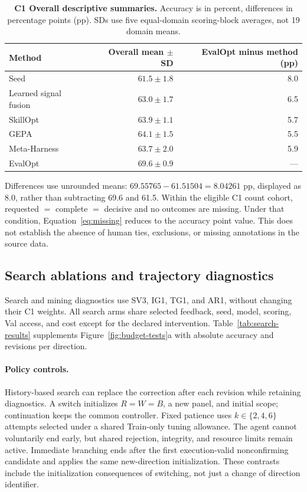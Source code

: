 \begin{table}[!htbp]
\caption{\textbf{C1 Overall descriptive summaries.}
Accuracy is in percent, differences in percentage points (pp).
SDs use five equal-domain scoring-block averages, not 19 domain means.}
\label{tab:c1-blocks}
\centering\small
\begin{tabularx}{\linewidth}{@{}Yrr@{}}
\toprule
Method & Overall mean $\pm$ SD & EvalOpt minus method (pp)\\
\midrule
Seed & $61.5\pm1.8$ & 8.0\\
Learned signal fusion & $63.0\pm1.7$ & 6.5\\
SkillOpt & $63.9\pm1.1$ & 5.7\\
GEPA & $64.1\pm1.5$ & 5.5\\
Meta-Harness & $63.7\pm2.0$ & 5.9\\
EvalOpt & $69.6\pm0.9$ & ---\\
\bottomrule
\end{tabularx}
\end{table}
Differences use unrounded means: $69.55765-61.51504=8.04261$ pp, displayed as 8.0, rather than subtracting 69.6 and 61.5.
Within the eligible C1 count cohort, requested $=$ complete $=$ decisive and no outcomes are missing.
Under that condition, Equation~\ref{eq:missing} reduces to the accuracy point value.
This does not establish the absence of human ties, exclusions, or missing annotations in the source data.

\subsection{Search ablations and trajectory diagnostics}
\label{app:ablations}
Search and mining diagnostics use SV3, IG1, TG1, and AR1, without changing their C1 weights.
All search arms share selected feedback, seed, model, scoring, Val access, and cost except for the declared intervention.
Table~\ref{tab:search-results} supplements Figure~\ref{fig:budget-tests}a with absolute accuracy and revisions per direction.

\paragraph{Policy controls.}
History-based search can replace the correction after each revision while retaining diagnostics.
A switch initializes $R=W=B$, a new panel, and initial scope; continuation keeps the common controller.
Fixed patience uses $k\in\{2,4,6\}$ attempts selected under a shared Train-only tuning allowance.
The agent cannot voluntarily end early, but shared rejection, integrity, and resource limits remain active.
Immediate branching ends after the first execution-valid nonconfirming candidate and applies the same new-direction initialization.
These contrasts include the initialization consequences of switching, not just a change of direction identifier.

